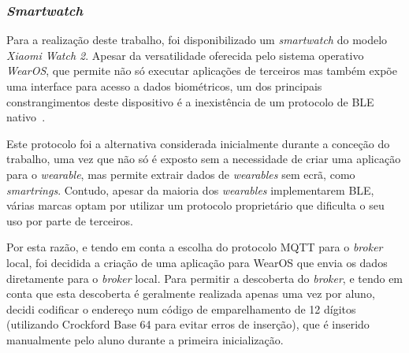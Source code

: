 \subsubsection{\textit{Smartwatch}}

Para a realização deste trabalho, foi disponibilizado um \textit{smartwatch} do modelo \textit{Xiaomi Watch 2}.
Apesar da versatilidade oferecida pelo sistema operativo \textit{WearOS}, que permite não só executar aplicações de terceiros mas também expõe uma interface para acesso a dados biométricos, um dos principais constrangimentos deste dispositivo é a inexistência de um protocolo de \ac{BLE} nativo~\cite{blexiaomi}.

Este protocolo foi a alternativa considerada inicialmente durante a conceção do trabalho, uma vez que não só é exposto sem a necessidade de criar uma aplicação para o \textit{wearable}, mas permite extrair dados de \textit{wearables} sem ecrã, como \textit{smartrings}.
Contudo, apesar da maioria dos \textit{wearables} implementarem \ac{BLE}, várias marcas optam por utilizar um protocolo proprietário que dificulta o seu uso por parte de terceiros.

Por esta razão, e tendo em conta a escolha do protocolo \ac{MQTT} para o \textit{broker} local, foi decidida a criação de uma aplicação para WearOS que envia os dados diretamente para o \textit{broker} local.
Para permitir a descoberta do \textit{broker}, e tendo em conta que esta descoberta é geralmente realizada apenas uma vez por aluno, decidi codificar o endereço num código de emparelhamento de 12 dígitos (utilizando Crockford Base 64 para evitar erros de inserção), que é inserido manualmente pelo aluno durante a primeira inicialização.


